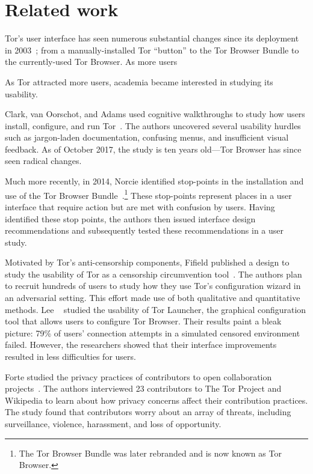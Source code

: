\section{Related work}
\label{sec:related-work}

Tor's user interface has seen numerous substantial changes since its deployment
in 2003~\cite{Syverson2005a}; from a manually-installed Tor ``button'' to the
Tor Browser Bundle to the currently-used Tor Browser.  As more users 

As Tor attracted more
users, academia became interested in studying its usability.

Clark, van Oorschot, and Adams used cognitive walkthroughs to study how users
install, configure, and run Tor~\cite{Clark2007a}.  The authors uncovered
several usability hurdles such as jargon-laden documentation, confusing menus,
and insufficient visual feedback.  As of October 2017, the study is ten years
old---Tor Browser has since seen radical changes.

Much more recently, in 2014, Norcie \ea identified stop-points in the
installation and use of the Tor Browser Bundle~\cite{Norcie2014a}.\footnote{The
Tor Browser Bundle was later rebranded and is now known as Tor Browser.}  These
stop-points represent places in a user interface that require action but are met
with confusion by users.  Having identified these stop points, the authors then
issued interface design recommendations and subsequently tested these
recommendations in a user study.

Motivated by Tor's anti-censorship components, Fifield \ea published a design to
study the usability of Tor as a censorship circumvention
tool~\cite{Fifield2015a}.  The authors plan to recruit hundreds of users to
study how they use Tor's configuration wizard in an adversarial setting.  This
effort made use of both qualitative and quantitative methods.  Lee
\ea~\cite{Lee2017a} studied the usability of Tor Launcher, the graphical
configuration tool that allows users to configure Tor Browser.  Their results
paint a bleak picture: 79\% of users' connection attempts in a simulated
censored environment failed.  However, the researchers showed that their
interface improvements resulted in less difficulties for users.

Forte \ea studied the privacy practices of contributors to open collaboration
projects~\cite{Forte2017a}.  The authors interviewed 23 contributors to The Tor
Project and Wikipedia to learn about how privacy concerns affect their
contribution practices.  The study found that contributors worry about an array
of threats, including surveillance, violence, harassment, and loss of
opportunity.

